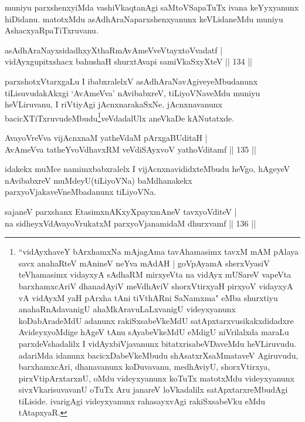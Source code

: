 \begin{artha}
muniyu parxshenxyiMda vashiVkaqtanAgi saMtoVSapaTuTx ivana keYyxyanunx hiDidanu. matotxMdu asAdhAraNaparxshenxyanunx keVLidaneMdu muniyu AshacxyaRpaTiTxruvanu.
\end{artha}

\begin{shl}
asAdhAraNayxsidadhxyXthaRmAvAmeVveVtayxtoV\s vadatf |\\
vidAyxgupitxshacx bahushaH shurxtAvapi samiVkaSxyXteV \hfill || 134 ||
\end{shl}

\begin{artha}
parxshotxVtarxgaLu I ibabxralelxV asAdhAraNavAgiveyeMbudanunx tiLisuvudakAkxgi `AvAmeVva' nAvibabxreV, tiLiyoVNaveMdu muniyu heVLiruvanu, I riVtiyAgi jAcnxnarakaSxNe. jAcnxnavanunx bacicXTiTxruvudeMbudu\footnote{``vidAyxhaveY bArxhamxNa mAjagAma tavAhamasimx tavxM mAM pAlaya savx anahaRteV mAnineV neYva mAdAH | goVpAyamA sherxVyasiV teVhamasimx vidayxyA sAdhaRM mirxyeVta na vidAyx mUSareV vapeVta barxhamxcAriV dhanadAyiV meVdhAviV shorxVtirxyaH pirxyoV vidayxyA vA vidAyxM yaH pArxha tAni tiVthARni SaNamxma" eMba shurxtiyu anahaRnAdavanigU ahaMkAravuLaLxvanigU videyxyanunx koDabAradeMdU adanunx rakiSxsabeVkeMdU satApxtarxvusikakxdidadxre AvideyxyoMdige hAgeV tAnu sAyabeVkeMdU eMdigU niVrilalxda maraLu parxdeVshadalilx I vidAyxbiVjavanunx bitatxrisabeVDaveMdu heVLiruvudu. adariMda idanunx bacicxDabeVkeMbudu shAsatxrXsaMmataveV Agiruvudu, barxhamxcAri, dhanavanunx koDuvavanu, medhAviyU, shorxVtirxya, pirxVtipArxtarxnU, oMdu videyxyanunx koTuTx matotxMdu videyxyanunx sivxVkarisuvavanU oTuTx Aru janareV loVkadalilx satApxtarxreMbudAgi tiLiside. ivarigAgi videyxyanunx rahasayxvAgi rakiSxsabeVku eMdu tAtapxyaR.}veVdadalUlx aneVkaDe kANutatxde.
\end{artha}

\begin{shl}
AvayoVreVva vijAcnxnaM yatheVdaM pArxgaBUditaH |\\
AvAmeVva tatheYvoVdhavxRM veVdiSAyxvoV yathoVditamf \hfill || 135 ||
\end{shl}

\begin{artha}
idakekx muMce namimxbabxralelx I vijAcnxnavididxteMbudu heVgo, hAgeyeV nAvibabxreV muMdeyU(tiLiyoVNa) baMdhanakekx parxyoVjakaveVneMbadanunx tiLiyoVNa.
\end{artha}

\begin{shl}
sajaneV parxshanx EtasimxnAKxyXpayxmAneV tavxyoVditeV |\\
na sidheyxVdAvayoVrukatxM parxyoVjanamidaM dhurxvamf \hfill || 136 ||
\end{shl}

